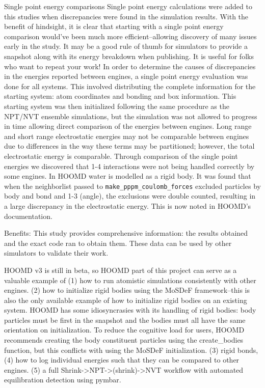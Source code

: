 

Single point energy comparisons
Single point energy calculations were added to this studies when discrepancies were found in the simulation results. With the benefit of hindsight, it is clear that starting with a single point energy comparison would've been much more efficient--allowing discovery of many issues early in the study. It may be a good rule of thumb for simulators to provide a snapshot along with its energy breakdown when publishing. It is useful for folks who want to repeat your work!
In order to determine the causes of discrepancies in the energies reported between engines, a single point energy evaluation was done for all systems. This involved distributing the complete information for the starting system: atom coordinates and bonding and box information. This starting system was then initialized following the same procedure as the NPT/NVT ensemble simulations, but the simulation was not allowed to progress in time allowing direct comparison of the energies between engines.
Long range and short range electrostatic energies may not be comparable between engines due to differences in the way these terms may be partitioned; however, the total electrostatic energy is comparable.
Through comparison of the single point energies we discovered that 1-4 interactions were not being handled correctly by some engines.
In HOOMD water is modelled as a rigid body. It was found that when the neighborlist passed to \lstinline{make_pppm_coulomb_forces} excluded particles by body and bond and 1-3 (angle), the exclusions were double counted, resulting in a large discrepancy in the electrostatic energy. This is now noted in HOOMD's documentation.

Benefits:
This study provides comprehensive information: the results obtained and the exact code ran to obtain them. These data can be used by other simulators to validate their work.

HOOMD v3 is still in beta, so HOOMD part of this project can serve as a valuable example of (1) how to run atomistic simulations consistently with other engines. (2) how to initialize rigid bodies using the MoSDeF framework--this is also the only available example of how to initialize rigid bodies on an existing system. HOOMD has some idiosyncrasies with its handling of rigid bodies: body particles must be first in the snapshot and the bodies must all have the same orientation on initialization. To reduce the cognitive load for users, HOOMD recommends creating the body constituent particles using the create\_bodies function, but this conflicts with using the MoSDeF initialization. (3) rigid bonds, (4) how to log individual energies such that they can be compared to other engines. (5) a full Shrink->NPT->(shrink)->NVT workflow with automated equilibration detection using pymbar.

